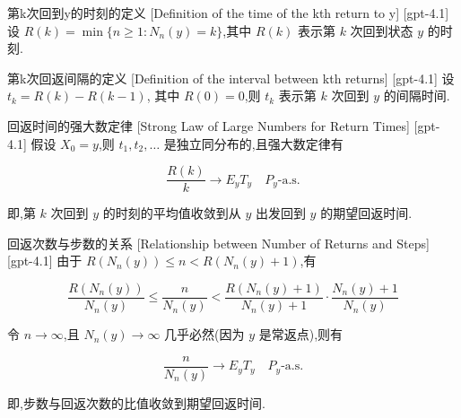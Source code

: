 \documentclass[UTF8]{ctexart}
\begin{document}
    
    
    \begin{dfn}
        {第k次回到y的时刻的定义}
        [Definition of the time of the kth return to y]
        [gpt-4.1]
        设 $R ( k ) = \operatorname* { min } \{ n \geq 1 : N _ { n } ( y ) = k \}$,其中 $R(k)$ 表示第 $k$ 次回到状态 $y$ 的时刻.
    \end{dfn}
    
    
    
    \begin{dfn}
        {第k次回返间隔的定义}
        [Definition of the interval between kth returns]
        [gpt-4.1]
        设 $t _ { k } = R ( k ) - R ( k - 1 )$, 其中 $R(0) = 0$,则 $t_k$ 表示第 $k$ 次回到 $y$ 的间隔时间.
    \end{dfn}
    
    
    
    \begin{thm}
        {回返时间的强大数定律}
        [Strong Law of Large Numbers for Return Times]
        [gpt-4.1]
        假设 $X_0 = y$,则 $t_1, t_2, \dotsc$ 是独立同分布的,且强大数定律有

\[
\frac{R ( k )}{k} \to E _ { y } T _ { y } \quad P _ { y }\text{-a.s.}
\]

即,第 $k$ 次回到 $y$ 的时刻的平均值收敛到从 $y$ 出发回到 $y$ 的期望回返时间.
    \end{thm}
    
    
    
    \begin{thm}
        {回返次数与步数的关系}
        [Relationship between Number of Returns and Steps]
        [gpt-4.1]
        由于 $R ( N _ { n } ( y ) ) \leq n < R ( N _ { n } ( y ) + 1 )$,有

\[
\frac { R ( N _ { n } ( y ) ) } { N _ { n } ( y ) } \leq \frac { n } { N _ { n } ( y ) } < \frac { R ( N _ { n } ( y ) + 1 ) } { N _ { n } ( y ) + 1 } \cdot \frac { N _ { n } ( y ) + 1 } { N _ { n } ( y ) }
\]

令 $n \to \infty$,且 $N_n(y) \to \infty$ 几乎必然(因为 $y$ 是常返点),则有

\[
\frac{n}{N_n(y)} \to E_y T_y \quad P_y\text{-a.s.}
\]

即,步数与回返次数的比值收敛到期望回返时间.
    \end{thm}
    
\end{document}
